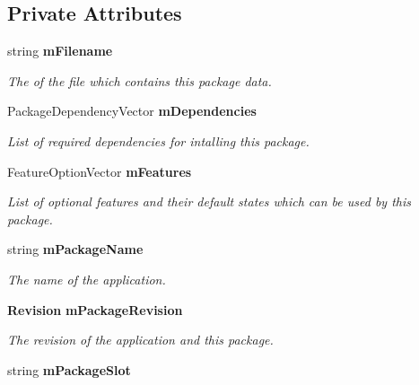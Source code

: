 \subsection*{Private Attributes}
\begin{DoxyCompactItemize}
\item 
string {\bf mFilename}\label{classPackage_aa41f13f9e923333a8b46acae30d270f1}

\begin{DoxyCompactList}\small\item\em The of the file which contains this package data. \item\end{DoxyCompactList}\item 
PackageDependencyVector {\bf mDependencies}\label{classPackage_a6d8e6bab8bff3c1556e0d5d905dc3d8a}

\begin{DoxyCompactList}\small\item\em List of required dependencies for intalling this package. \item\end{DoxyCompactList}\item 
FeatureOptionVector {\bf mFeatures}\label{classPackage_a2b2a1ec40d748d09448c43fd60c229fe}

\begin{DoxyCompactList}\small\item\em List of optional features and their default states which can be used by this package. \item\end{DoxyCompactList}\item 
string {\bf mPackageName}\label{classPackage_a5bc5975a73c02ede4079dd713720df64}

\begin{DoxyCompactList}\small\item\em The name of the application. \item\end{DoxyCompactList}\item 
{\bf Revision} {\bf mPackageRevision}\label{classPackage_a8b11b249e073f5f83df80461ec8c79b7}

\begin{DoxyCompactList}\small\item\em The revision of the application and this package. \item\end{DoxyCompactList}\item 
string {\bf mPackageSlot}\label{classPackage_a8c9d27c4e14cb8a0a850bf9b472ca149}


\end{DoxyCompactItemize}
